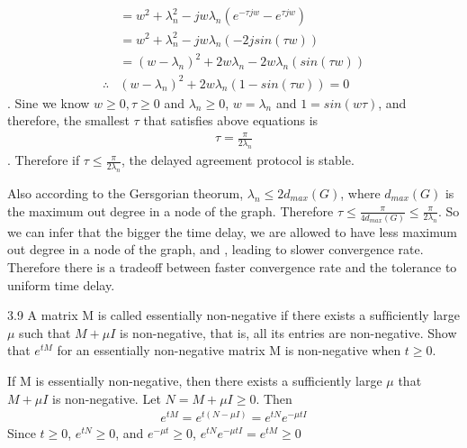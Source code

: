 \documentclass{article}
\begin{document}
\begin{problem}
\begin{align*}
        &= w^2 + \lambda_n^2 - jw\lambda_n(e^{-\tau jw}  - e^{\tau jw} ) \\
        &= w^2 + \lambda_n^2 - jw\lambda_n(-2jsin(\tau w)) \\
        &= (w-\lambda_n)^2 + 2w \lambda_n - 2w\lambda_n(sin(\tau w))\\
        \therefore &(w - \lambda_n)^2 + 2w\lambda_n(1-sin(\tau w)) = 0
    \end{align*}.
    Sine we know $w \geq 0, \tau \geq 0$ and $\lambda_n \geq 0$, $w = \lambda_n$ and $1 = sin(w\tau)$, and therefore, the smallest $\tau$ that satisfies above equations is
    \begin{align*}
        \tau = \frac{\pi}{2\lambda_n} 
    \end{align*}.
    Therefore if $\tau \leq \frac{\pi}{2\lambda_n}$, the delayed agreement protocol is stable.

    Also according to the Gersgorian theorum, $\lambda_n \leq 2 d_{max}(G)$, where $d_{max}(G)$ is the maximum out degree in a node of the graph. Therefore  $\tau \leq \frac{\pi}{4 d_{max}(G)}\leq \frac{\pi}{2\lambda_n}$. So we can infer that the bigger the time delay, we are allowed to have less maximum out degree in a node of the graph, and , leading to slower convergence rate.  Therefore there is a tradeoff between faster convergence rate and the tolerance to uniform time delay. 
\end{problem}
\begin{problem} 3.9
    A matrix M is called essentially non-negative if there exists a sufﬁciently large $\mu$ such that $M + \mu I$ is non-negative, that is, all its entries are non-negative. Show that $e^{tM}$ for an essentially non-negative matrix M is non-negative when $t \geq 0.$

    If M is essentially non-negative, then there exists a sufficiently large $\mu$ that $M + \mu I$ is non-negative. Let $N = M + \mu I \geq 0$. Then 
    \begin{align*}
        e^{tM} = e^{t(N - \mu I)} = e^{tN}e^{-\mu  tI}
    \end{align*}
    Since $t \geq 0$, $e^{tN} \geq 0$, and $e^{-\mu t} \geq 0$, $e^{tN}e^{-\mu t I} = e^{tM} \geq 0$
\end{problem}
\end{document}
